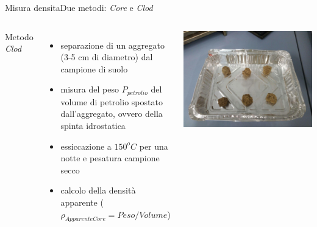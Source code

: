 \documentclass[10pt]{beamer}
\begin{document}
\begin{frame}{Misura densita}{Due metodi: \emph{Core} e \emph{Clod}}

  \begin{columns}[c]
     Metodo \emph{Clod}
    \begin{itemize}[<+->]
    \item separazione di un aggregato (3-5 cm di diametro) dal
      campione di suolo
    \item misura del peso $P_{petrolio}$ del volume di petrolio
      spostato dall'aggregato, ovvero della spinta idrostatica
    \item essiccazione a $150^oC$ per una notte e pesatura campione
      secco
    \item calcolo della densit\`a apparente
      ($\rho_{ApparenteCore} = Peso/Volume$)
    \end{itemize}
    \includegraphics[width=\textwidth]{../foto/pallinespinta.jpeg}
  \end{columns}
\end{frame}
\end{document}
